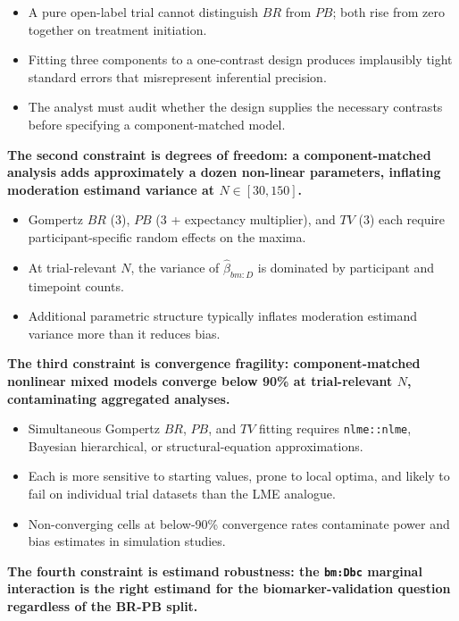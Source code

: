 \documentclass[
  11pt,
]{article}
\begin{document}
\begin{itemize}\setlength{\itemsep}{2pt}\setlength{\parskip}{0pt}
\item A pure open-label trial cannot distinguish $BR$ from $PB$; both rise from zero together on treatment initiation.
\item Fitting three components to a one-contrast design produces implausibly tight standard errors that misrepresent inferential precision.
\item The analyst must audit whether the design supplies the necessary contrasts before specifying a component-matched model.
\end{itemize}

\textbf{The second constraint is degrees of freedom: a component-matched analysis adds approximately a dozen non-linear parameters, inflating moderation estimand variance at $N \in [30, 150]$.}

\begin{itemize}\setlength{\itemsep}{2pt}\setlength{\parskip}{0pt}
\item Gompertz $BR$ (3), $PB$ (3 + expectancy multiplier), and $TV$ (3) each require participant-specific random effects on the maxima.
\item At trial-relevant $N$, the variance of $\hat\beta_{bm:D}$ is dominated by participant and timepoint counts.
\item Additional parametric structure typically inflates moderation estimand variance more than it reduces bias.
\end{itemize}

\textbf{The third constraint is convergence fragility: component-matched nonlinear mixed models converge below 90\% at trial-relevant $N$, contaminating aggregated analyses.}

\begin{itemize}\setlength{\itemsep}{2pt}\setlength{\parskip}{0pt}
\item Simultaneous Gompertz $BR$, $PB$, and $TV$ fitting requires \texttt{nlme::nlme}, Bayesian hierarchical, or structural-equation approximations.
\item Each is more sensitive to starting values, prone to local optima, and likely to fail on individual trial datasets than the LME analogue.
\item Non-converging cells at below-90\% convergence rates contaminate power and bias estimates in simulation studies.
\end{itemize}

\textbf{The fourth constraint is estimand robustness: the \texttt{bm:Dbc} marginal interaction is the right estimand for the biomarker-validation question regardless of the BR-PB split.}
\end{document}
